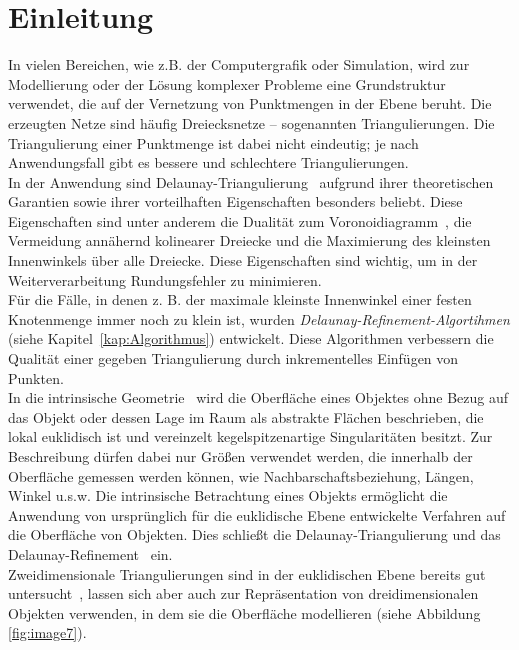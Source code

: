 \chapter{ Einleitung}


In vielen Bereichen, wie z.B. der Computergrafik oder Simulation, wird zur Modellierung oder der Lösung komplexer Probleme eine  Grundstruktur verwendet, die auf der Vernetzung von Punktmengen in der Ebene beruht. Die erzeugten Netze sind häufig Dreiecksnetze -- sogenannten  Triangulierungen.
Die Triangulierung einer Punktmenge ist dabei nicht eindeutig; je nach Anwendungsfall gibt es bessere und schlechtere Triangulierungen.\\ 
In der Anwendung  sind Delaunay-Triangulierung~\cite{lee:1986:DelaunayTriangulation} aufgrund  ihrer theoretischen Garantien sowie ihrer  vorteilhaften Eigenschaften besonders beliebt. Diese Eigenschaften sind unter anderem die Dualität zum Voronoidiagramm~\cite{aurenhammer:2000:voronoi}, die Vermeidung annähernd kolinearer Dreiecke und die Maximierung  des kleinsten Innenwinkels über alle Dreiecke. Diese Eigenschaften sind wichtig, um in der Weiterverarbeitung Rundungsfehler zu minimieren.\\
Für die Fälle, in denen z. B. der maximale kleinste Innenwinkel einer festen Knotenmenge immer noch zu klein ist, wurden \textit{Delaunay-Refinement-Algortihmen} (siehe Kapitel~\ref{kap:Algorithmus}) entwickelt. Diese Algorithmen verbessern die Qualität einer gegeben Triangulierung  durch inkrementelles Einfügen von Punkten. \\

In die intrinsische Geometrie~\cite{Bobenko:2006:SIGGRAPH,Bobenko:2007:LaplaceBeltrami} wird die Oberfläche eines Objektes ohne Bezug auf das Objekt oder dessen Lage im Raum als abstrakte Flächen beschrieben,  die lokal euklidisch ist und vereinzelt kegelspitzenartige Singularitäten besitzt. Zur Beschreibung dürfen dabei nur Größen verwendet werden, die  innerhalb der Oberfläche gemessen werden können, wie Nachbarschaftsbeziehung, Längen, Winkel u.s.w. Die intrinsische Betrachtung eines Objekts ermöglicht die Anwendung von ursprünglich für die euklidische Ebene entwickelte Verfahren auf die Oberfläche von Objekten. Dies schließt die Delaunay-Triangulierung  \cite{Bobenko:2006:SIGGRAPH} und das Delaunay-Refinement~\cite{Sharp:2019:NIT} ein. \\

Zweidimensionale Triangulierungen sind in  der euklidischen Ebene bereits gut untersucht~\cite{SHEWCHUK:2002:chuws}, lassen sich aber auch zur Repräsentation von dreidimensionalen Objekten verwenden, in dem sie die Oberfläche modellieren (siehe Abbildung \ref{fig:image7}). \\ 

